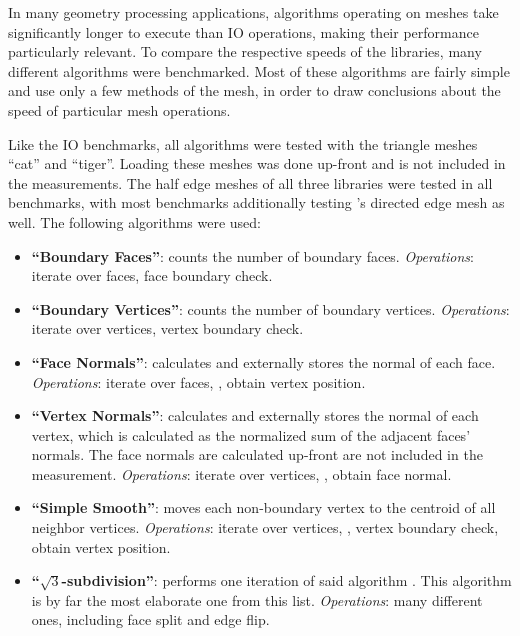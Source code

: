 In many geometry processing applications, algorithms operating on meshes take significantly longer to execute than IO operations, making their performance particularly relevant.
To compare the respective speeds of the libraries, many different algorithms were benchmarked.
Most of these algorithms are fairly simple and use only a few methods of the mesh, in order to draw conclusions about the speed of particular mesh operations.

Like the IO benchmarks, all algorithms were tested with the triangle meshes \enquote{cat} and \enquote{tiger}.
Loading these meshes was done up-front and is not included in the measurements.
The half edge meshes of all three libraries were tested in all benchmarks, with most benchmarks additionally testing 's directed edge mesh as well.
The following algorithms were used:

\begin{itemize}
  \item \textbf{\enquote{Boundary Faces}}: counts the number of boundary faces.
  \emph{Operations}: iterate over faces, face boundary check.
  \item \textbf{\enquote{Boundary Vertices}}: counts the number of boundary vertices.
  \emph{Operations}: iterate over vertices, vertex boundary check.
  \item \textbf{\enquote{Face Normals}}: calculates and externally stores the normal of each face.
  \emph{Operations}: iterate over faces, , obtain vertex position.
  \item \textbf{\enquote{Vertex Normals}}: calculates and externally stores the normal of each vertex, which is calculated as the normalized sum of the adjacent faces' normals.
  The face normals are calculated up-front are not included in the measurement.
  \emph{Operations}: iterate over vertices, , obtain face normal.
  \item \textbf{\enquote{Simple Smooth}}: moves each non-boundary vertex to the centroid of all neighbor vertices.
  \emph{Operations}: iterate over vertices, , vertex boundary check, obtain vertex position.
  \item \textbf{\enquote{$\sqrt{3}$-subdivision}}: performs one iteration of said algorithm \cite{kobbelt20003}.
  This algorithm is by far the most elaborate one from this list.
  \emph{Operations}: many different ones, including face split and edge flip.
\end{itemize}

\vspace{1cm}

